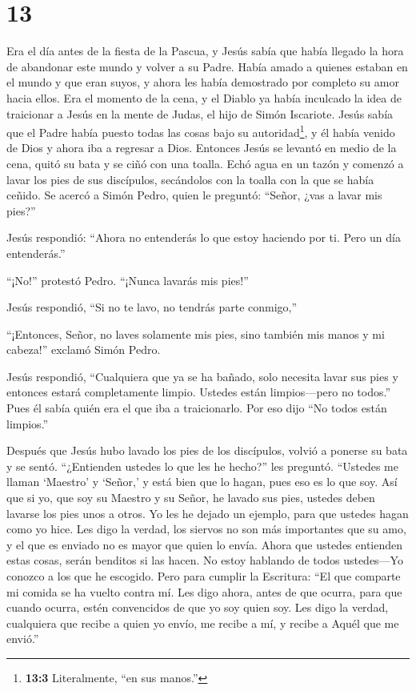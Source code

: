 \hypertarget{section-12}{%
\section{13}\label{section-12}}

 Era el día antes de la fiesta de la Pascua, y Jesús sabía
que había llegado la hora de abandonar este mundo y volver a su Padre.
Había amado a quienes estaban en el mundo y que eran suyos, y ahora les
había demostrado por completo su amor hacia ellos.  Era el
momento de la cena, y el Diablo ya había inculcado la idea de traicionar
a Jesús en la mente de Judas, el hijo de Simón Iscariote. 
Jesús sabía que el Padre había puesto todas las cosas bajo su
autoridad\footnote{\textbf{13:3} Literalmente, ``en sus manos.''}, y él
había venido de Dios y ahora iba a regresar a Dios. 
Entonces Jesús se levantó en medio de la cena, quitó su bata y se ciñó
con una toalla.  Echó agua en un tazón y comenzó a lavar los
pies de sus discípulos, secándolos con la toalla con la que se había
ceñido.  Se acercó a Simón Pedro, quien le preguntó:
``Señor, ¿vas a lavar mis pies?''

 Jesús respondió: ``Ahora no entenderás lo que estoy
haciendo por ti. Pero un día entenderás.''

 ``¡No!'' protestó Pedro. ``¡Nunca lavarás mis pies!''

Jesús respondió, ``Si no te lavo, no tendrás parte conmigo,''

 ``¡Entonces, Señor, no laves solamente mis pies, sino
también mis manos y mi cabeza!'' exclamó Simón Pedro.

 Jesús respondió, ``Cualquiera que ya se ha bañado, solo
necesita lavar sus pies y entonces estará completamente limpio. Ustedes
están limpios---pero no todos.''  Pues él sabía quién era
el que iba a traicionarlo. Por eso dijo ``No todos están limpios.''

 Después que Jesús hubo lavado los pies de los discípulos,
volvió a ponerse su bata y se sentó. ``¿Entienden ustedes lo que les he
hecho?'' les preguntó.  ``Ustedes me llaman `Maestro' y
`Señor,' y está bien que lo hagan, pues eso es lo que soy. 
Así que si yo, que soy su Maestro y su Señor, he lavado sus pies,
ustedes deben lavarse los pies unos a otros.  Yo les he
dejado un ejemplo, para que ustedes hagan como yo hice. 
Les digo la verdad, los siervos no son más importantes que su amo, y el
que es enviado no es mayor que quien lo envía.  Ahora que
ustedes entienden estas cosas, serán benditos si las hacen.
 No estoy hablando de todos ustedes---Yo conozco a los que
he escogido. Pero para cumplir la Escritura: ``El que comparte mi comida
se ha vuelto contra mí.  Les digo ahora, antes de que
ocurra, para que cuando ocurra, estén convencidos de que yo soy quien
soy.  Les digo la verdad, cualquiera que recibe a quien yo
envío, me recibe a mí, y recibe a Aquél que me envió.''

